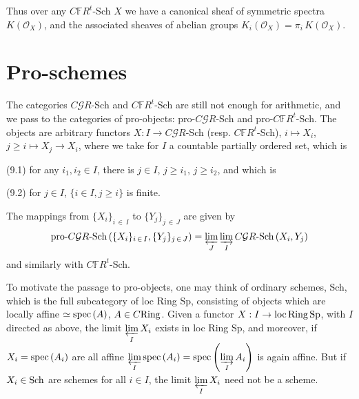 \documentclass[leqno]{article}
\numberwithin{equation}{section}
\begin{document}
\smallskip

Thus over any $C{\mathbb F} R^t$-Sch $X$ we have a canonical sheaf of symmetric spectra $K({\mathcal O}_X)$, and the associated sheaves of abelian groups $K_i ({\mathcal O}_X) = \pi_i \, K ({\mathcal O}_X)$.



\section{Pro-schemes}

The categories $C{\mathcal G} R$-Sch and $C{\mathbb F} R^t$-Sch are still not enough for arithmetic, and we pass to the categories of pro-objects: pro-$C{\mathcal G} R$-Sch and pro-$C{\mathbb F} R^t$-Sch. The objects are arbitrary functors $X : I \to C{\mathcal G} R$-Sch (resp. $C{\mathbb F} R^t$-Sch), $i \mapsto X_i$, $j \geq i \mapsto X_j \to X_i$, where we take for $I$ a countable partially ordered set, which is

\bigskip

\noindent (9.1)  for any $i_1 , i_2 \in I$, there is $j \in I$, $j \geq i_1$, $j \geq i_2$, and which is

\bigskip

\noindent (9.2)  for $j \in I$, $\{i \in I , j \geq i \}$ is finite.

\bigskip

The mappings from $\{X_i \}_{i \, \in \, I}$ to $\{Y_j \}_{j \, \in \, J}$ are given by
\setcounter{equation}{2}
\begin{equation}
\label{eq93}
\mbox{pro-$C{\mathcal G} R$-Sch} \, ( \{ X_i \}_{i \, \in \, I} , \{Y_j \}_{j \, \in \, J}) = \varprojlim_J \varinjlim_I \mbox{$C{\mathcal G} R$-Sch} \, (X_i , Y_j)
\end{equation}
and similarly with $C{\mathbb F} R^t$-Sch.

\smallskip

To motivate the passage to pro-objects, one may think of ordinary schemes, Sch, which is the full subcategory of loc Ring Sp, consisting of objects which are locally affine $\simeq {\rm spec} \, (A)$, $A \in C {\rm Ring}$. Given a functor $X : I \to {\rm loc \, Ring \, Sp}$, with $I$ directed as above, the limit $\underset{I}{\varprojlim} \, X_i$ exists in loc Ring Sp, and moreover, if $X_i = {\rm spec} \, (A_i)$ are all affine $\underset{I}{\varprojlim} \, {\rm spec} \, (A_i) = {\rm spec} \left( \underset{I}{\varinjlim} \, A_i \right)$ is again affine. But if $X_i \in {\rm Sch}$ are schemes for all $i \in I$, the limit $\underset{I}{\varprojlim} \, X_i$ need not be a scheme.
\end{document}
